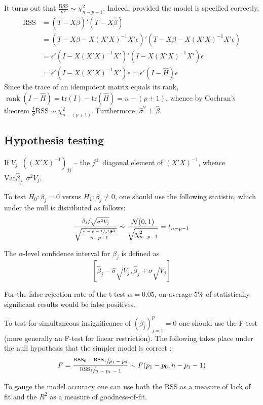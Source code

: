 \documentclass[a4paper]{article}
\newcommand{\clo}[1]{{\left [ #1 \right ]}}
\newcommand{\brac}[1]{{\left ( #1 \right )}}
\newcommand{\Ncal}{\mathcal{N}}
\newcommand{\Var}[0]{{\text{Var}}}
\newcommand{\RSS}{\text{RSS}}
\newcommand{\tr}{\text{tr}}
\newcommand{\rank}{\mathop{\text{rank}}\nolimits}
\newcommand{\defn}{\mathop{\overset{\Delta}{=}}\nolimits}
\begin{document}
It turns out that $\frac{\RSS}{\sigma^2}\sim \chi^2_{n-p-1}$.
Indeed, provided the model is specified correctly, \begin{align*}
	\RSS &= \brac{T-X\hat{\beta}}'\brac{T-X\hat{\beta}} \\
	& = \brac{T-X\beta - X\brac{X'X}^{-1}X'\epsilon}'\brac{T-X\beta - X\brac{X'X}^{-1}X'\epsilon} \\
	& = \epsilon' \brac{I - X\brac{X'X}^{-1}X'}'\brac{I - X\brac{X'X}^{-1}X'}\epsilon \\
	& = \epsilon' \brac{ I - X\brac{X'X}^{-1}X' } \epsilon = \epsilon' \brac{ I - \hat{H} } \epsilon
\end{align*}
Since the trace of an idempotent matrix equals its rank, $\rank(I - \hat{H}) = \tr(I) - \tr(\hat{H}) = n- (p+1)$, whence by Cochran's theorem $\frac{1}{\sigma}\RSS\sim\chi^2_{n-(p+1)}$.
Furthermore, $\hat{\sigma}^2 \perp \hat{\beta}$.

\subsection{Hypothesis testing} %
\label{sub:hypothesis_testing}

If $V_j \defn \brac{\brac{X'X}^{-1}}_{jj}$ -- the $j^\text{th}$ diagonal element of $\brac{X'X}^{-1}$,
whence $\Var\hat{\beta}_j\defn \sigma^2 V_j$.

To test $H_0:\beta_j=0$ versus $H_1:\beta_j\neq 0$, one should use the following statistic, which under the null is distributed as follows:
\[\frac{\sfrac{\hat{\beta}_j}{\sqrt{\sigma^2 V_j}}}{\sqrt{ \frac{\sfrac{n-p-1}{\sigma^2} \hat{\sigma}^2 }{ n-p-1 } }} \sim \frac{\Ncal(0, 1)}{\sqrt{\chi^2_{n-p-1}}} = t_{n-p-1}\]

The $\alpha$-level confidence interval for $\beta_j$ is defined as
\[\clo{ \hat{\beta}_j - \hat{\sigma} \sqrt{ V_j },  \hat{\beta}_j + \hat{\sigma} \sqrt{ V_j } }\]

For the false rejection rate of the t-test $\alpha = 0.05$, on average $5\%$ of statistically significant results would be false positives.

To test for simultaneous insignificance of $\brac{\beta_j}_{j=1}^p = 0$ one should use the F-test
(more generally an F-test for linear restriction). The following takes place under the null hypothesis that the simpler model is correct :
\[F = \frac{\sfrac{\RSS_0-\RSS_1}{p_1-p_0}}{\sfrac{\RSS_1}{n-p_1-1}}\sim F(p_1-p_0, n-p_1-1)\]

To gauge the model accuracy one can use both the RSS as a measure of lack of fit and the $R^2$ as a measure of goodness-of-fit.
\end{document}
